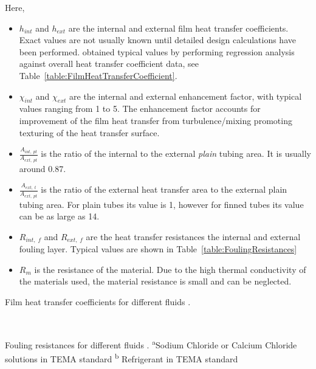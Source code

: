     Here,
    \begin{itemize}
        \item \(h_{int}\) and \(h_{ext}\) are the internal and external film heat transfer coefficients. Exact values are not usually known until detailed design calculations have been performed. \citeauthor{Astolfi2014C} \cite{Astolfi2014C} obtained typical values by performing regression analysis against overall heat transfer coefficient data, see Table~\ref{table:FilmHeatTransferCoefficient}.
        \item \(\chi_{int}\) and \(\chi_{ext}\) are the internal and external enhancement factor, with typical values ranging from 1 to 5. The enhancement factor accounts for improvement of the film heat transfer from turbulence/mixing promoting texturing of the heat transfer surface.  
        \item \(\frac{A_{int,\;pt}}{A_{ext,\;pt}}\) is the ratio of the internal to the external \emph{plain} tubing area. It is usually around \num{0.87}.
        \item \(\frac{A_{ext,\;t}}{A_{ext,\;pt}}\) is the ratio of the external heat transfer area to the external plain tubing area. For plain tubes its value is \num{1}, however for finned tubes its value can be as large as \num{14}.
        \item \(R_{int,\;f}\) and \(R_{ext,\;f}\) are the heat transfer resistances the internal and external fouling layer. Typical values are shown in Table~\ref{table:FoulingResistances}
        \item \(R_{m}\) is the resistance of the material. Due to the high thermal conductivity of the materials used, the material resistance is small and can be neglected. 
    \end{itemize}

    \begin{table}[H]
        \caption{Film heat transfer coefficients for different fluids \cite{Astolfi2014C}.}
        \centering 
        \label{table:FilmHeatTransferCoefficient}
        
        \\[10pt]
    \end{table}

    \begin{table}[H]
        \caption[Fouling resistances for different fluids.]{Fouling resistances for different fluids \cite{TEMA2019}. \textsuperscript{a}Sodium Chloride or Calcium Chloride solutions in TEMA standard \textsuperscript{b} Refrigerant in TEMA standard}
        \centering 
        \label{table:FoulingResistances}
        
        \\[10pt]
    \end{table}

